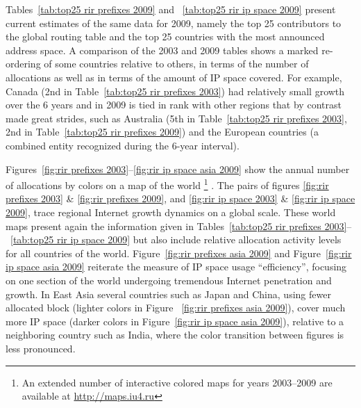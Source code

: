 Tables~\ref{tab:top25 rir prefixes 2009} and ~\ref{tab:top25 rir ip space 2009}
present current estimates of the same data for 2009, namely the top 25
contributors to the global routing table and the top 25 countries with the most
announced address space. A comparison of the 2003 and 2009 tables shows a
marked re-ordering of some countries relative to others, in terms of the number
of allocations as well as in terms of the amount of IP space covered. For
example, Canada (2nd in Table~\ref{tab:top25 rir prefixes 2003}) had relatively
small growth over the 6 years and in 2009 is tied in rank with other regions
that by contrast made great strides, such as Australia (5th in
Table~\ref{tab:top25 rir prefixes 2003}, 2nd in Table~\ref{tab:top25 rir
prefixes 2009}) and the European countries (a combined entity recognized during
the 6-year interval).

Figures~\ref{fig:rir prefixes 2003}--\ref{fig:rir ip space asia 2009} show the
annual number of allocations by colors on a map of the world%
%
\footnote{%
An extended number of interactive colored maps for years 2003--2009 are
available at \url{http://maps.iu4.ru}}%
%
. The pairs of figures \ref{fig:rir prefixes 2003} \& \ref{fig:rir prefixes
2009}, and \ref{fig:rir ip space 2003} \& \ref{fig:rir ip space 2009}, trace
regional Internet growth dynamics on a global scale. These world maps present
again the information given in Tables~\ref{tab:top25 rir prefixes
2003}--~\ref{tab:top25 rir ip space 2009} but also include relative allocation
activity levels for all countries of the world. Figure~\ref{fig:rir prefixes
asia 2009} and Figure~\ref{fig:rir ip space asia 2009} reiterate the measure
of IP space usage ``efficiency'', focusing on one section of the world
undergoing tremendous Internet penetration and growth. In East Asia several
countries such as Japan and China, using fewer allocated block (lighter colors
in Figure ~\ref{fig:rir prefixes asia 2009}), cover much more IP space (darker
colors in Figure~\ref{fig:rir ip space asia 2009}), relative to a neighboring
country such as India, where the color transition between figures is less
pronounced.
